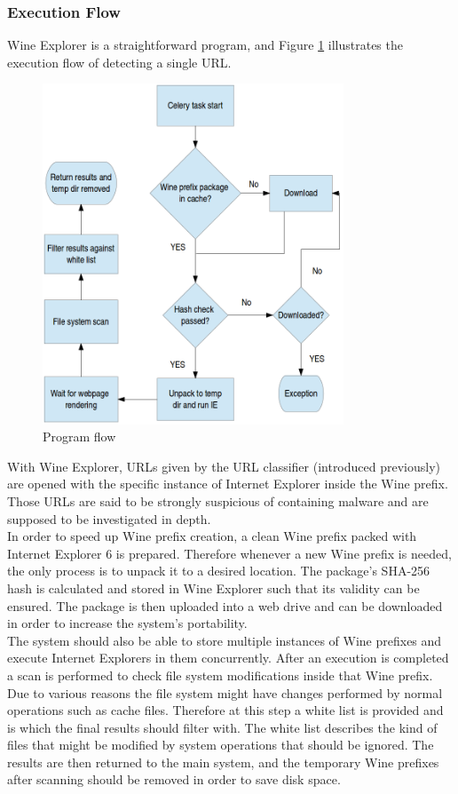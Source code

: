 \subsubsection{Execution Flow}
Wine Explorer is a straightforward program, and Figure \ref{fig:wine}
illustrates the execution flow of detecting a single URL. \\
\begin{figure}[htb]
\centering
\includegraphics[width=0.8\textwidth]{img/wine-flowchart.png}
\caption{Program flow}
\label{fig:wine}
\end{figure}
With Wine Explorer, URLs given by the URL classifier (introduced 
previously) are opened with the specific instance of Internet Explorer inside the Wine 
prefix. 
Those URLs are said to be strongly suspicious of containing malware and are 
supposed to be investigated in depth. \\
In order to speed up Wine prefix creation, a clean Wine prefix packed with 
Internet Explorer 6 is prepared. Therefore whenever a new Wine prefix is needed, 
the only process is to unpack it to a desired location. 
The package's SHA-256 hash is calculated and stored in Wine Explorer such that 
its validity can be ensured. 
The package is then uploaded into a web drive and can be downloaded in 
order to increase the system's portability. \\
The system should also be able to store multiple instances of Wine prefixes 
and execute Internet Explorers in them concurrently. 
After an execution is completed a scan is performed to check file system 
modifications inside that Wine prefix. 
Due to various reasons the file system might have changes performed by normal 
operations such as cache files. 
Therefore at this step a white list is provided and is which the final 
results should filter with. The white list describes the kind of 
files that might be modified by system operations that should be ignored. 
The results are then returned to the main system, and the temporary Wine 
prefixes after scanning should be removed in order to save disk space. 

